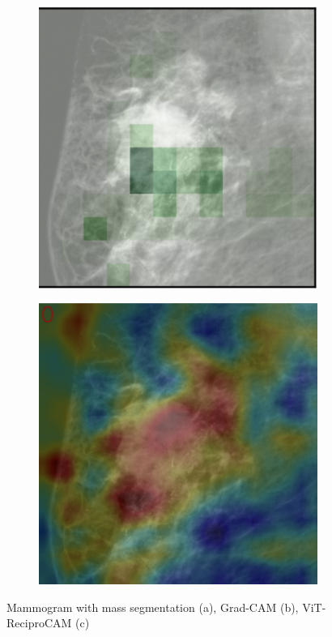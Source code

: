 \documentclass[a4paper,10pt]{book}
\begin{document}
\begin{figure}[h!]
\begin{subfigure}[c]{0.30\textwidth}
        \includegraphics[width=\textwidth]{reports//assets/gcam.png}
        \caption{}
        \label{fig:mlo_grad_2}
    \end{subfigure}
      \begin{subfigure}[c]{0.30\textwidth}
        \centering
        \includegraphics[width=\textwidth]{reports//assets/recipro.png}
        \caption{}
        \label{fig:mlo_recipro_2}
    \end{subfigure}
    \caption[GradCAM vs. ViT-Recipro with TOMPEI Segmentation]{Mammogram with mass segmentation (a), Grad-CAM (b), ViT-ReciproCAM (c)}
    \label{fig:grad_vs_vit_two}
\end{figure}
\end{document}
